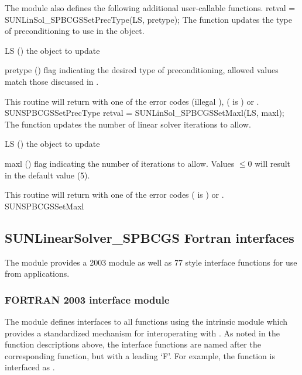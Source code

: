 The {\sunlinsolspbcgs} module also defines the following additional
user-callable functions.
%
%
{
  retval = SUNLinSol\_SPBCGSSetPrecType(LS, pretype);
}
{
  The function  updates the type of
  preconditioning to use in the {\sunlinsolspbcgs} object.
}
{
  \begin{args}[pretype]
  \item[LS] ()
    the {\sunlinsolspbcgs} object to update
  \item[pretype] ()
    flag indicating the desired type of preconditioning, allowed
    values match those discussed in .
  \end{args}
}
{
  This routine will return with one of the error codes
   (illegal ), 
  ( is ) or .
}
{}
{SUNSPBCGSSetPrecType}
%
%
{
  retval = SUNLinSol\_SPBCGSSetMaxl(LS, maxl);
}
{
  The function  updates the number of
  linear solver iterations to allow.
}
{
  \begin{args}[maxl]
  \item[LS] ()
    the {\sunlinsolspbcgs} object to update
  \item[maxl] ()
    flag indicating the number of iterations to allow. Values $\le0$
    will result in the default value (5).
  \end{args}
}
{
  This routine will return with one of the error codes
   ( is ) or .
}
{}
{SUNSPBCGSSetMaxl}


\subsection{SUNLinearSolver\_SPBCGS Fortran interfaces}
\label{ss:sunlinsol_spbcgs_fortran}

The {\sunlinsolspbcgs} module provides a {\F} 2003 module as well as {\F} 77
style interface functions for use from {\F} applications.

\subsubsection*{FORTRAN 2003 interface module}
The  {\F} module defines interfaces to all
{\sunlinsolspbcgs} {\CC} functions using the intrinsic 
module which provides a standardized mechanism for interoperating with {\CC}. As
noted in the {\CC} function descriptions above, the interface functions are
named after the corresponding {\CC} function, but with a leading `F'. For
example, the function  is interfaced as
.

